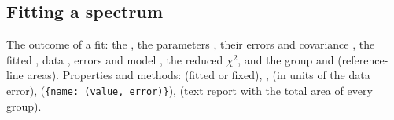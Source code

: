 \subsection{Fitting a spectrum}\label{sec:fitting}

The outcome of a fit: the , the parameters , their errors  and
covariance , the fitted , data , errors  and model
, the reduced $\chi^2$, and the group  and  (reference-line
areas). Properties and methods:  (fitted or fixed), ,
 (in units of the data error),  (\texttt{\{name: (value,
error)\}}),  (text report with the total area of every group).

